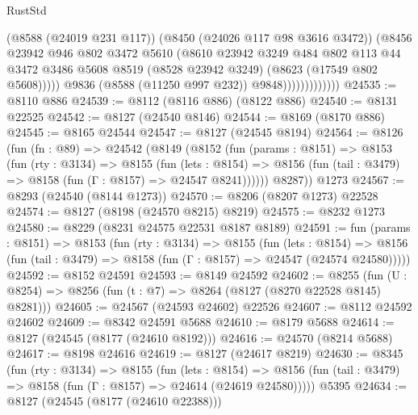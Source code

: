 \begin{lexlean}{RustStd}
\begin{coremodule}
                                (@8588 (@24019 @231 @117))
                                (@8450 (@24026 @117 @98 @3616 @3472))
                                (@8456
                                  @23942
                                  @946
                                  @802
                                  @3472
                                  @5610
                                  (@8610
                                    @23942
                                    @3249
                                    @484
                                    @802
                                    @113
                                    @44
                                    @3472
                                    @3486
                                    @5608
                                    @8519
                                    (@8528 @23942 @3249)
                                    (@8623 (@17549 @802 @5608)))))
                              @9836
                              (@8588 (@11250 @997 @232))
                              @9848)))))))))))))
@24535 := @8110 @886
@24539 := @8112 (@8116 @886) (@8122 @886)
@24540 := @8131 @22525
@24542 := @8127 (@24540 @8146)
@24544 := @8169 (@8170 @886)
@24545 := @8165 @24544
@24547 := @8127 (@24545 @8194)
@24564 := @8126
    (fun (fn : @89) =>
    @24542
      (@8149
        (@8152
          (fun (params : @8151) =>
          @8153
            (fun (rty : @3134) =>
            @8155
              (fun (lets : @8154) =>
              @8156 (fun (tail : @3479) => @8158 (fun (Γ : @8157) => @24547 @8241))))))
        @8287))
    @1273
@24567 := @8293 (@24540 (@8144 @1273))
@24570 := @8206 (@8207 @1273) @22528
@24574 := @8127 (@8198 (@24570 @8215) @8219)
@24575 := @8232 @1273
@24580 := @8229 (@8231 @24575 @22531 @8187 @8189)
@24591 := fun (params : @8151) =>
  @8153
    (fun (rty : @3134) =>
    @8155
      (fun (lets : @8154) =>
      @8156 (fun (tail : @3479) => @8158 (fun (Γ : @8157) => @24547 (@24574 @24580)))))
@24592 := @8152 @24591
@24593 := @8149 @24592
@24602 := @8255
    (fun (U : @8254) => @8256 (fun (t : @7) => @8264 (@8127 (@8270 @22528 @8145) @8281)))
@24605 := @24567 (@24593 @24602) @22526
@24607 := @8112 @24592 @24602
@24609 := @8342 @24591 @5688
@24610 := @8179 @5688
@24614 := @8127 (@24545 (@8177 (@24610 @8192)))
@24616 := @24570 (@8214 @5688)
@24617 := @8198 @24616
@24619 := @8127 (@24617 @8219)
@24630 := @8345
    (fun (rty : @3134) =>
    @8155
      (fun (lets : @8154) =>
      @8156 (fun (tail : @3479) => @8158 (fun (Γ : @8157) => @24614 (@24619 @24580)))))
    @5395
@24634 := @8127 (@24545 (@8177 (@24610 @22388)))

\end{coremodule}
\end{lexlean}
